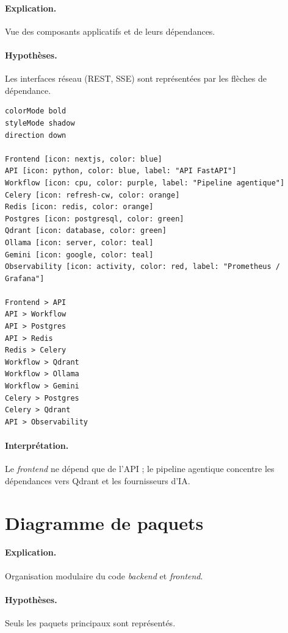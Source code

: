\paragraph{Explication.} Vue des composants applicatifs et de leurs dépendances.
\paragraph{Hypothèses.} Les interfaces réseau (REST, SSE) sont représentées par
les flèches de dépendance.

\begin{lstlisting}[style=eraser,caption={Diagramme de composants (Eraser)},label={lst:comp}]
colorMode bold
styleMode shadow
direction down

Frontend [icon: nextjs, color: blue]
API [icon: python, color: blue, label: "API FastAPI"]
Workflow [icon: cpu, color: purple, label: "Pipeline agentique"]
Celery [icon: refresh-cw, color: orange]
Redis [icon: redis, color: orange]
Postgres [icon: postgresql, color: green]
Qdrant [icon: database, color: green]
Ollama [icon: server, color: teal]
Gemini [icon: google, color: teal]
Observability [icon: activity, color: red, label: "Prometheus / Grafana"]

Frontend > API
API > Workflow
API > Postgres
API > Redis
Redis > Celery
Workflow > Qdrant
Workflow > Ollama
Workflow > Gemini
Celery > Postgres
Celery > Qdrant
API > Observability
\end{lstlisting}

\paragraph{Interprétation.} Le \emph{frontend} ne dépend que de l'API ; le
pipeline agentique concentre les dépendances vers Qdrant et les fournisseurs d'IA.

\section{Diagramme de paquets}
\paragraph{Explication.} Organisation modulaire du code \emph{backend} et
\emph{frontend}.
\paragraph{Hypothèses.} Seuls les paquets principaux sont représentés.

